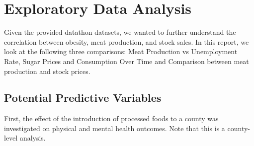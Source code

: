 \documentclass[letterpaper, 11pt]{report}
\begin{document}






\section{Exploratory Data Analysis}

Given the provided datathon datasets, we wanted to further understand the correlation between obesity, meat production, and stock sales. In this report, we look at the following three comparisons: Meat Production vs Unemployment Rate, Sugar Prices and Consumption Over Time and Comparison between meat production and stock prices.


\subsection*{Potential Predictive Variables}

First, the effect of the introduction of processed foods to a county was investigated on physical and mental health outcomes. Note that this is a county-level analysis.
\end{document}
